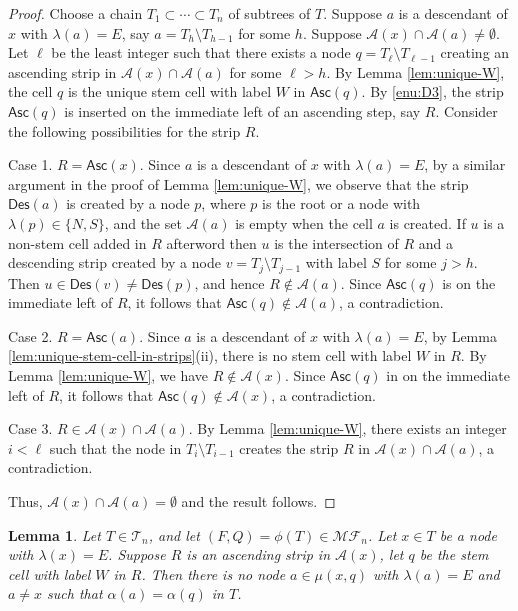 \documentclass[a4paper,11pt,reqno]{amsart}
\newtheorem{lem}{Lemma}[section]
\theoremstyle{definition}
\numberwithin{equation}{section}
\newcommand{\A}{{\mathcal{A}}}
\newcommand{\Des}{{\textsf{Des}}}
\newcommand{\Asc}{{\textsf{Asc}}}
\newcommand{\MF}{{\mathcal{MF}}}
\newcommand{\T}{{\mathcal{T}}}
\begin{document}
\begin{proof}  Choose a chain $T_1\subset \cdots\subset T_n$ of subtrees of $T$. 
Suppose $a$ is a descendant of $x$ with $\lambda(a)=E$, say $a=T_h\setminus T_{h-1}$ for some $h$. 
Suppose $\A(x)\cap\A(a)\neq\emptyset$. Let $\ell$ be the least integer such that there exists a node $q=T_{\ell}\setminus T_{\ell-1}$ creating an ascending strip in $\A(x)\cap\A(a)$ for some $\ell>h$. By Lemma \ref{lem:unique-W}, the cell $q$ is the unique stem cell with label $W$ in $\Asc(q)$. By \ref{enu:D3}, the strip $\Asc(q)$ is inserted on the immediate left of an ascending step, say $R$. Consider the following possibilities for the strip $R$.


Case 1.  $R=\Asc(x)$. Since $a$ is a descendant of $x$ with $\lambda(a)=E$, by a similar argument in the proof of Lemma \ref{lem:unique-W}, we observe that the strip $\Des(a)$ is created by a node $p$, where $p$ is the root or a node with $\lambda(p)\in\{N,S\}$, and the set
 $\A(a)$ is empty when the cell $a$ is created. If $u$ is a non-stem cell added in $R$ afterword then $u$ is the intersection of $R$ and a descending strip created by a node $v=T_j\setminus T_{j-1}$ with label $S$ for some $j>h$. Then $u\in\Des(v)\neq\Des(p)$, and hence $R\not\in\A(a)$. Since $\Asc(q)$ is on the immediate left of $R$, it follows that $\Asc(q)\not\in\A(a)$, a contradiction.

Case 2.  $R=\Asc(a)$. Since $a$ is a descendant of $x$ with $\lambda(a)=E$, by Lemma \ref{lem:unique-stem-cell-in-strips}(ii), there is no stem cell with label $W$ in $R$.
By Lemma \ref{lem:unique-W}, we have $R\not\in\A(x)$. Since $\Asc(q)$ in on the immediate left of $R$,  it follows that $\Asc(q)\not\in \A(x)$, a contradiction.

Case 3.  $R\in\A(x)\cap\A(a)$. By Lemma \ref{lem:unique-W}, there exists an integer $i<\ell$ such that the node in $T_i\setminus T_{i-1}$ creates the strip $R$ in $\A(x)\cap\A(a)$, a contradiction.

Thus, $\A(x)\cap\A(a)=\emptyset$ and the result follows. 
\end{proof}






\smallskip
\begin{lem} \label{lem:No_E}
Let $T\in\T_n$, and let $(F,Q)=\phi(T)\in\MF_n$.  Let $x\in T$ be a node with $\lambda(x)=E$.
Suppose $R$ is an ascending strip in $\A(x)$, let $q$ be the stem cell with label $W$ in $R$. Then there is no node $a\in\mu(x,q)$ with $\lambda(a)=E$ and $a\neq x$ such that $\alpha(a)=\alpha(q)$ in $T$.
\end{lem}
\end{document}
